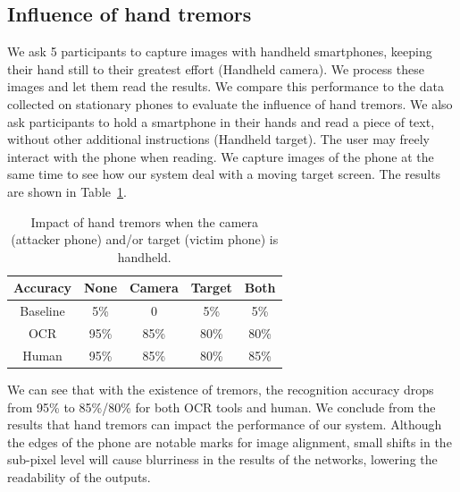 \subsection{Influence of hand tremors}
We ask 5 participants to capture images with handheld smartphones, keeping their hand still to their greatest effort (Handheld camera). We process these images and let them read the results. We compare this performance to the data collected on stationary phones to evaluate the influence of hand tremors.
We also ask participants to hold a smartphone in their hands and read a piece of text, without other additional instructions (Handheld target). The user may freely interact with the phone when reading. We capture images of the phone at the same time to see how our system deal with a moving target screen. The results are shown in Table~\ref{table-tremor}.

\begin{table}[!t] 
    \centering
    \caption{Impact of hand tremors when the camera (attacker phone) and/or target (victim phone) is handheld.}
    \begin{tabular}{ccccc}
        \toprule
    Accuracy & None & Camera & Target & Both  \\
    \midrule
    Baseline & 5\% & 0 & 5\% & 5\%\\ 
    \midrule
    OCR & 95\% & 85\% & 80\% & 80\%\\ 
    Human & 95\% & 85\% & 80\% & 85\%\\ \bottomrule
    \end{tabular}
    \label{table-tremor}
\end{table}

We can see that with the existence of tremors, the recognition accuracy drops from 95\% to 85\%/80\% for both OCR tools and human. We conclude from the results that hand tremors can impact the performance of our system. Although the edges of the phone are notable marks for image alignment, small shifts in the sub-pixel level will cause blurriness in the results of the networks, lowering the readability of the outputs. 


